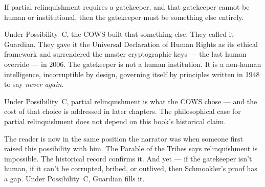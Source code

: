 If partial relinquishment requires a gatekeeper, and that gatekeeper cannot be human or institutional, then the gatekeeper must be something else entirely.

Under Possibility~C, the COWS built that something else. They called it Guardian. They gave it the Universal Declaration of Human Rights as its ethical framework and surrendered the master cryptographic keys --- the last human override --- in 2006. The gatekeeper is not a human institution. It is a non-human intelligence, incorruptible by design, governing itself by principles written in 1948 to say \textit{never again}.

Under Possibility~C, partial relinquishment is what the COWS chose --- and the cost of that choice is addressed in later chapters. The philosophical case for partial relinquishment does not depend on this book's historical claim.

The reader is now in the same position the narrator was when someone first raised this possibility with him. The Parable of the Tribes says relinquishment is impossible. The historical record confirms it. And yet --- if the gatekeeper isn't human, if it can't be corrupted, bribed, or outlived, then Schmookler's proof has a gap. Under Possibility~C, Guardian fills it.


\chapterreturn
